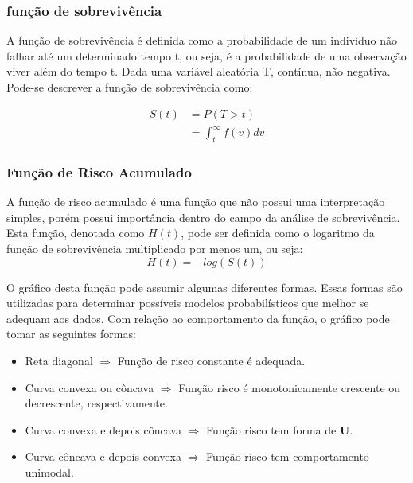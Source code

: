 		
\subsubsection*{função de sobrevivência}

A função de sobrevivência é definida como a probabilidade de um indivíduo não falhar até um determinado tempo t, ou seja, é a probabilidade de uma observação viver além do tempo t. Dada uma variável aleatória T, contínua, não negativa. Pode-se descrever a função de sobrevivência como:

\begin{equation} \label{eq:1}
	\begin{split}
		S(t) & = P(T > t) \\
		& = \int_t^{\infty} f(v)dv 
  	\end{split}
\end{equation} 

\subsubsection*{Função de Risco Acumulado}

A função de risco acumulado é uma função que não possui uma interpretação simples, porém possui importância dentro do campo da análise de sobrevivência. Esta função, denotada como $H(t)$, pode ser definida como o logaritmo da função de sobrevivência multiplicado por menos um, ou seja:
\begin{equation} \label{eq:riskcum}
 H(t) = -log(S(t))
\end{equation}

O gráfico desta função pode assumir algumas diferentes formas. Essas formas são utilizadas para determinar possíveis modelos probabilísticos que melhor se adequam aos dados. Com relação ao comportamento da função, o gráfico pode tomar as seguintes formas:

\begin{itemize}
	\item Reta diagonal $\Rightarrow$ Função de risco constante é adequada.
	\item Curva convexa ou côncava $\Rightarrow$ Função
risco é monotonicamente crescente ou decrescente, respectivamente.
	\item Curva convexa e depois côncava $\Rightarrow$ Função risco tem forma de \textbf{U}.
	\item Curva côncava e depois convexa $\Rightarrow$ Função risco tem comportamento unimodal.
\end{itemize}

